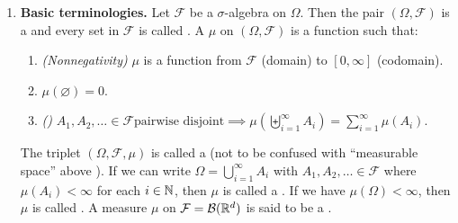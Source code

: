 \begin{enumerate}
\item\label{it:meas-basic-terms} \textbf{Basic terminologies.}
Let \(\mathcal{F}\) be a \(\sigma\)-algebra on \(\Omega\). Then the pair
\((\Omega,\mathcal{F})\) is a  and every set in \(\mathcal{F}\) is called .
A  \(\mu\) on \((\Omega,\mathcal{F})\) is a function such that:
\begin{enumerate}[label={(\arabic*)}]
\item \emph{(Nonnegativity)} \(\mu\) is a function from \(\mathcal{F}\) (domain) to \([0,\infty]\) (codomain).
\item \(\mu(\varnothing)=0\).
\item \emph{()} \(A_1,A_2,\dotsc\in\mathcal{F}\text{
pairwise disjoint} \implies
\mu(\biguplus_{i=1}^{\infty}A_i)=\sum_{i=1}^{\infty}\mu(A_i)\).
\end{enumerate}

The triplet \((\Omega,\mathcal{F},\mu)\) is called a  (not
to be confused with ``measurable space'' above \warn{}).  If we can write
\(\Omega=\bigcup_{i=1}^{\infty}A_i\) with \(A_1,A_2,\dotsc\in\mathcal{F}\)
where \(\mu(A_i)<\infty\) for each \(i\in\mathbb{N}\), then \(\mu\) is called a
. If we have \(\mu(\Omega)<\infty\), then \(\mu\) is called
. A measure \(\mu\) on \(\mathcal{F}=\mathcal{B}(\mathbb{R}^d)\) is said
to be a .


\end{enumerate}
